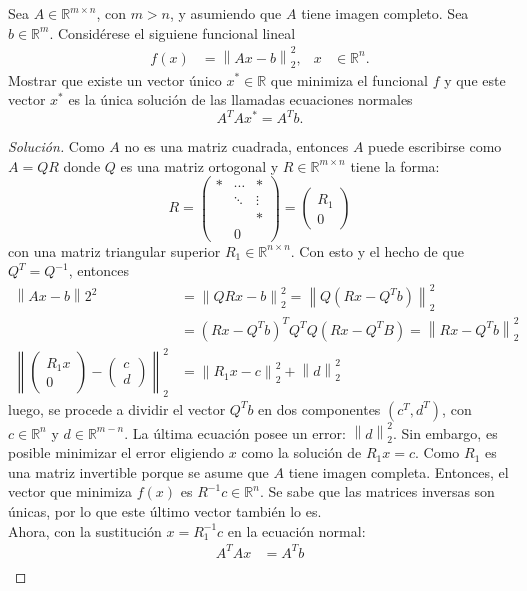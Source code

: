\documentclass[12pt]{book}
\newcommand{\R}{\mathbb{R}}
\newcommand\norm[1]{\left\lVert#1\right\rVert}
\newenvironment{solucion}
  {\renewcommand\qedsymbol{$\square$}\begin{proof}[Solución]}
  {\end{proof}}
\begin{document}
\eje Sea $A\in\R^{m\times n}$, con $m>n$, y asumiendo que $A$ tiene imagen completo. Sea $b\in\R^m$. Considérese el siguiene funcional lineal
\begin{align*}
    f(x)&=\norm{Ax-b}_2^2, & x&\in\R^n.
\end{align*}
Mostrar que existe un vector único $x^*\in\R$ que minimiza el funcional $f$ y que este vector $x^*$ es la única solución de las llamadas ecuaciones normales
\[ A^TAx^*=A^Tb.\]
\begin{solucion}
Como $A$ no es una matriz cuadrada, entonces $A$ puede escribirse como $A=QR$ donde $Q$ es una matriz ortogonal y $R\in\R^{m\times n}$ tiene la forma:
\[ R= \begin{pmatrix}
* & \cdots & *\\
& \ddots & \vdots\\
& & *\\
& 0 &
\end{pmatrix}=\begin{pmatrix}
R_1\\
0
\end{pmatrix}\]
con una matriz triangular superior $R_1\in\R^{n\times n}$. Con esto y el hecho de que $Q^T=Q^{-1}$, entonces
\begin{align*}
    \norm{Ax-b}2^2&=\norm{QRx-b}_2^2=\norm{Q(Rx-Q^Tb)}^2_2\\
    &=(Rx-Q^Tb)^TQ^TQ\left(Rx-Q^TB\right)=\norm{Rx-Q^Tb}_2^2\\
    \norm{\begin{pmatrix}
    R_1x\\
    0
    \end{pmatrix}-\begin{pmatrix}
    c\\
    d
    \end{pmatrix}}_2^2&=\norm{R_1x-c}_2^2+\norm{d}_2^2
\end{align*}
luego, se procede a dividir el vector $Q^Tb$ en dos componentes $\left(c^T,d^T\right)$, con $c\in\R^n$ y $d\in\R^{m-n}$.
La última ecuación posee un error: $\norm{d}_2^2$. Sin embargo, es posible minimizar el error eligiendo $x$ como la solución de $R_1x=c$. Como $R_1$ es una matriz invertible porque se asume que $A$ tiene imagen completa. Entonces, el vector que minimiza $f(x)$ es $R^{-1}c\in\R^n$. Se sabe que las matrices inversas son únicas, por lo que este último vector también lo es.\\
Ahora, con la sustitución $x=R_1^{-1}c$ en la ecuación normal:
\begin{align*}
    A^TAx&=A^Tb\\

\end{align*}
\end{solucion}
\end{document}
